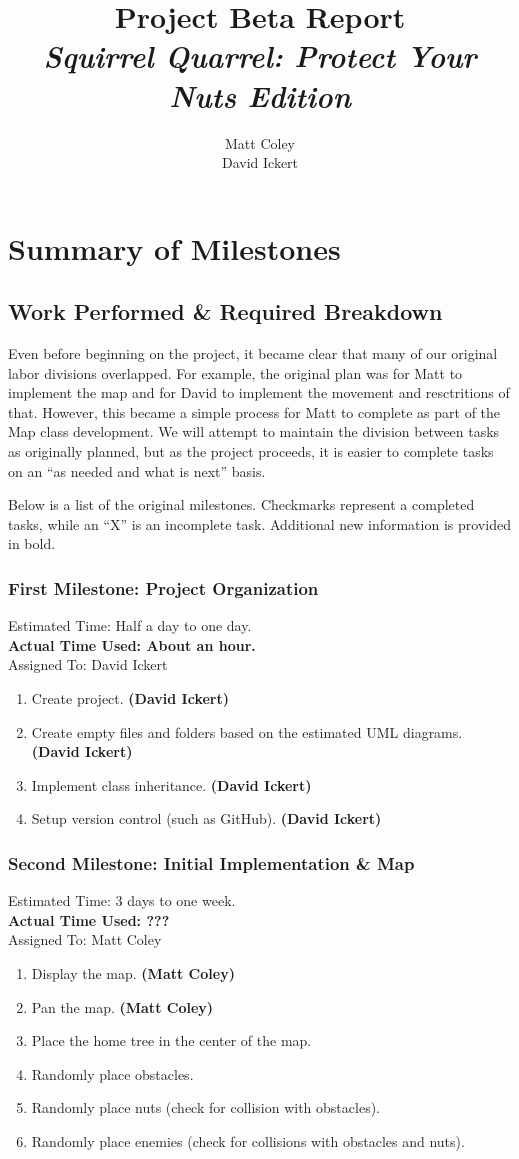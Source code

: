 \documentclass[]{article}
\title{Project Beta Report\\\textit{Squirrel Quarrel: Protect Your Nuts Edition}}
\author{Matt Coley\\David Ickert\\}
\newcommand*\good{\item[\Checkmark]}
\newcommand*\bad{\item[\XSolidBrush]}
\begin{document}
	\maketitle
	\newpage
	\tableofcontents
	\newpage
	\section{Summary of Milestones}
	\subsection{Work Performed \& Required Breakdown}
		Even before beginning on the project, it became clear that many of our original labor divisions overlapped.  For example, the original plan was for Matt to implement the map and for David to implement the movement and resctritions of that.  However, this became a simple process for Matt to complete as part of the Map class development.  We will attempt to maintain the division between tasks as originally planned, but as the project proceeds, it is easier to complete tasks on an ``as needed and what is next'' basis.
		
		Below is a list of the original milestones.  Checkmarks represent a completed tasks, while an ``X'' is an incomplete task.  Additional new information is provided in bold.
		\subsubsection{First Milestone: Project Organization}
		Estimated Time: Half a day to one day.\\
		\textbf{Actual Time Used: About an hour.}\\
		Assigned To: David Ickert
		\begin{enumerate}
			\good Create project. \textbf{(David Ickert)}
			\good Create empty files and folders based on the estimated UML diagrams. \textbf{(David Ickert)}
			\good Implement class inheritance. \textbf{(David Ickert)}
			\good Setup version control (such as GitHub). \textbf{(David Ickert)}
		\end{enumerate}		
		\subsubsection{Second Milestone: Initial Implementation \& Map}
		Estimated Time: 3 days to one week.\\
		\textbf{Actual Time Used: ???}\\		
		Assigned To: Matt Coley 
		\begin{enumerate}
			\good Display the map. \textbf{(Matt Coley)}
			\good Pan the map. \textbf{(Matt Coley)}
			\bad Place the home tree in the center of the map.
			\bad Randomly place obstacles.
			\bad Randomly place nuts (check for collision with obstacles).
			\bad Randomly place enemies (check for collisions with obstacles and nuts).
		\end{enumerate}	
\end{document}
